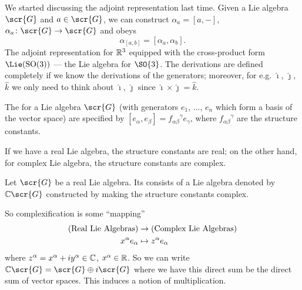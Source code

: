
We started discussing the adjoint representation last time. Given
a Lie algebra $\scr{G}$ and $a\in\scr{G}$, we can construct
$\alpha_a=[a,-]$, $\alpha_a\colon\scr{G}\to\scr{G}$ and obeys
\begin{equation}
\alpha_{[a,b]}=[\alpha_a,\alpha_b].
\end{equation}
The adjoint representation for $\Bbb{R}^{3}$ equipped with the
cross-product form $\Lie({\rm SO}(3))$ --- the Lie algebra for
$\SO{3}$. The derivations are defined completely if we know the
derivations of the generators; moreover, for e.g. $\widehat{\imath}$,
$\widehat{\jmath}$, $\widehat{k}$ we only need to think about
$\widehat{\imath}$, $\widehat{\jmath}$ since
$\widehat{\imath}\times\widehat{\jmath}=\widehat{k}$. 

\begin{defn}
The  for a Lie algebra $\scr{G}$
(with generators $e_1$, ..., $e_n$ which form a basis of the
vector space) are specified by
$[e_\alpha,e_\beta]={f_{\alpha\beta}}^{\gamma}e_{\gamma}$, where
${f_{\alpha\beta}}^{\gamma}$ are the structure constants.
\end{defn}
\begin{rmk}
If we have a real Lie algebra, the structure constants are real;
on the other hand, for complex Lie algebra, the structure
constants are complex.
\end{rmk}
\begin{defn}
Let $\scr{G}$ be a real Lie algebra. Its
 consists of a Lie algebra denoted by
$\Bbb{C}\scr{G}$ constructed by making the structure constants complex.
\end{defn}
So complexification is some ``mapping''
\begin{align*}
(\hbox{Real Lie Algebras})&\to(\hbox{Complex Lie Algebras})\\
x^{\alpha}e_{\alpha}&\mapsto z^{\alpha}e_{\alpha}
\end{align*}
where $z^{\alpha}=x^{\alpha}+iy^{\alpha}\in\Bbb{C}$,
$x^\alpha\in\Bbb{R}$. So we can write
$\Bbb{C}\scr{G}=\scr{G}\oplus i\scr{G}$ where we have this direct
sum be the direct sum of vector spaces. This induces a notion of
multiplication.

